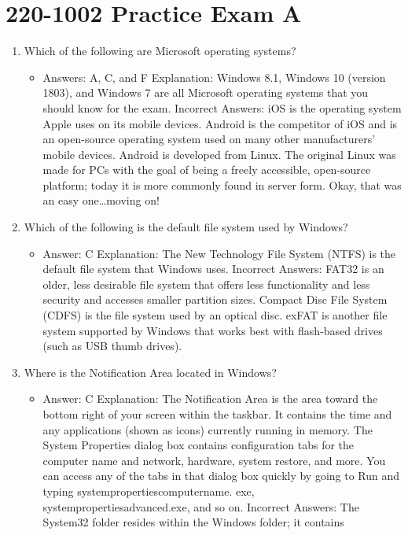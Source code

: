 \documentclass{article}
\begin{document}
\section{220-1002 Practice Exam A}
\begin{enumerate}
    \item Which of the following are Microsoft operating systems? 
    \begin{itemize}
        \item Answers: A, C, and F
Explanation: Windows 8.1, Windows 10 (version 1803), and Windows 7 are all
Microsoft operating systems that you should know for the exam.
Incorrect Answers: iOS is the operating system Apple uses on its mobile devices.
Android is the competitor of iOS and is an open-source operating system used on many
other manufacturers’ mobile devices. Android is developed from Linux. The original Linux
was made for PCs with the goal of being a freely accessible, open-source platform; today
it is more commonly found in server form. Okay, that was an easy one…moving on!
    \end{itemize}
    \item Which of the following is the default file system used by Windows? 
    \begin{itemize}
        \item Answer: C
Explanation: The New Technology File System (NTFS) is the default file system that
Windows uses.
Incorrect Answers: FAT32 is an older, less desirable file system that offers less functionality
and less security and accesses smaller partition sizes. Compact Disc File System
(CDFS) is the file system used by an optical disc. exFAT is another file system supported
by Windows that works best with flash-based drives (such as USB thumb drives).
    \end{itemize}
    \item Where is the Notification Area located in Windows?
    \begin{itemize}
        \item Answer: C
Explanation: The Notification Area is the area toward the bottom right of your screen
within the taskbar. It contains the time and any applications (shown as icons) currently
running in memory. The System Properties dialog box contains configuration tabs for
the computer name and network, hardware, system restore, and more. You can access
any of the tabs in that dialog box quickly by going to Run and typing systempropertiescomputername.
exe, systempropertiesadvanced.exe, and so on.
Incorrect Answers: The System32 folder resides within the Windows folder; it contains

\end{itemize}
\end{enumerate}
\end{document}
